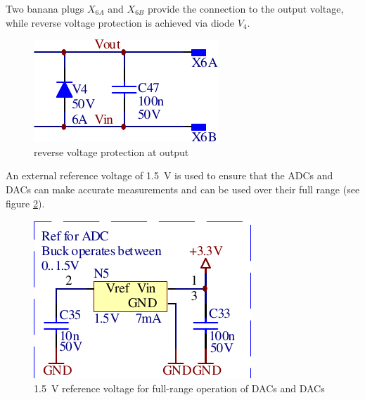 Two banana  plugs $X_{6A}$ and $X_{6B}$  provide the connection to  the output
voltage, while reverse voltage protection is achieved via diode $V_4$.

\begin{figure}[th!]
    \center
    \includegraphics[width=.35\textwidth]{images/circuit/output-connectors.pdf}
    \caption{reverse voltage protection at output}
    \label{fig:circuit:output}
\end{figure}

An external  reference voltage of \SI{1.5}{\volt}  is used to ensure  that the
ADCs and DACs can  make accurate measurements and can be  used over their full
range (see figure \ref{fig:circuit:vref}).

\begin{figure}[th!]
    \center
    \includegraphics[width=.4\textwidth]{images/circuit/vref.pdf}
    \caption{%
        \SI{1.5}{\volt} reference voltage for full-range operation of DACs and
        DACs
    }
    \label{fig:circuit:vref}
\end{figure}
